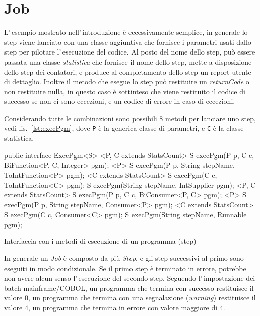 \chapter{Job}

L'\,esempio mostrato nell'\,introduzione è eccessivamente semplice, in generale
lo step viene lanciato con una classe aggiuntiva che fornisce i parametri usati
dallo step per pilotare l'\,esecuzione del codice.
Al posto del nome dello step, può essere passata una classe \textsl{statistica}
che fornisce il nome dello step, mette a disposizione dello step dei contatori,
e produce al completamento dello step un report utente di dettaglio.
Inoltre il metodo che esegue lo step può restituire un \textsl{returnCode} o
non restituire nulla, in questo caso è sottinteso che viene restituito il codice
di successo se non ci sono eccezioni, e un codice di errore in caso di
eccezioni.

Considerando tutte le combinazioni sono possibili 8 metodi per lanciare uno
step, vedi lis.~\ref{lst:execPgm}, dove \texttt{P} è la generica classe di
parametri, e \texttt{C} è la classe statistica.
\begin{elisting}[!htb]
\begin{javacode}
public interface ExecPgm<S> {
    <P, C extends StatsCount> S execPgm(P p, C c, BiFunction<P, C, Integer> pgm);
    <P> S execPgm(P p, String stepName, ToIntFunction<P> pgm);
    <C extends StatsCount> S execPgm(C c, ToIntFunction<C> pgm);
    S execPgm(String stepName, IntSupplier pgm);
    <P, C extends StatsCount> S execPgm(P p, C c, BiConsumer<P, C> pgm);
    <P> S execPgm(P p, String stepName, Consumer<P> pgm);
    <C extends StatsCount> S execPgm(C c, Consumer<C> pgm);
    S execPgm(String stepName, Runnable pgm);
}
\end{javacode}
\caption{Interfaccia con i metodi di esecuzione di un programma (step)}
\label{lst:execPgm}
\end{elisting}

In generale un \textit{Job} è composto da più \textit{Step}, e gli step
successivi al primo sono eseguiti in modo condizionale.
Se il primo step è terminato in errore, potrebbe non avere alcun senso
l'\,esecuzione del secondo step.
Seguendo l'\,impostazione dei batch mainframe/COBOL, un programma che termina
con successo restituisce il valore $0$, un programma che termina con una
segnalazione (\textit{warning}) restituisce il valore $4$, un programma che
termina in errore con valore maggiore di $4$.


